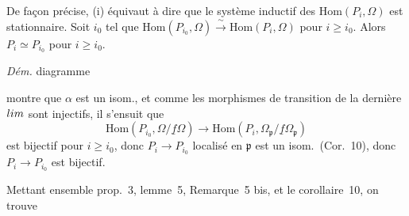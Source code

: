 \documentclass[11pt,a4paper]{article}
\begin{document}
De façon précise, (i) \struck{\ill{}} équivaut à dire que le système inductif
des $\mathrm{Hom}(P_i, \Omega)$ est stationnaire. Soit $i_0$ tel que
$\mathrm{Hom}(P_{i_0}, \Omega) \xrightarrow{\ \sim\ } \mathrm{Hom}(P_i, \Omega)$
pour $i \geq i_0$. Alors $P_i \simeq P_{i_0}$ pour $i \geq i_0$.

\emph{Dém.}  diagramme


montre que $\alpha$ est un isom., et comme les morphismes de transition de la
dernière $\varinjlim$ sont injectifs, il s'ensuit que
\[
  \mathrm{Hom}(P_{i_0}, \Omega/\underline{f}\Omega) \to
  \mathrm{Hom}(P_i, \Omega_{\mathfrak{p}}/\underline{f}\Omega_{\mathfrak{p}})
\]
est bijectif pour $i \geq i_0$, donc $P_i \to P_{i_0}$ localisé en
$\mathfrak{p}$ est un isom.\ (Cor.~10), donc $P_i \to P_{i_0}$ est bijectif.

Mettant ensemble prop.~3, lemme~5,  Remarque~5 bis, et le
corollaire~10, on trouve
\end{document}
